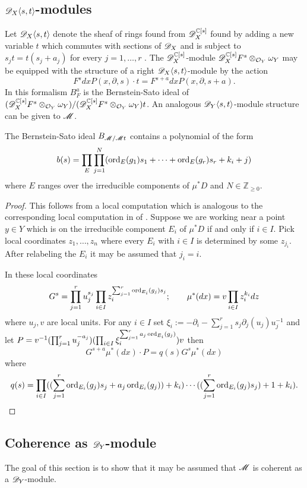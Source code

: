  \subsection{$\mathscr{D}_X\langle s, t\rangle$-modules}
 Let $\mathscr{D}_X\langle s,t \rangle$ denote the sheaf of rings found from $\mathscr{D}_X^{\mathbb{C}[s]}$ found by adding a new variable $t$ which commutes with sections of $\mathscr{D}_X$ and is subject to $s_j t = t(s_j +a_j)$ for every $j=1,\ldots, r$ .
 The $\mathscr{D}_X^{\mathbb{C}[s]}$-module $\mathscr{D}_X^{\mathbb{C}[s]} F^s\otimes_{\mathcal{O}_Y}\omega_Y$ may be equipped with the structure of a right $\mathscr{D}_X\langle s, t\rangle$-module by the action
 $$F^sdx P(x,\partial,s) \cdot t  =F^{s + a}dx P(x,\partial, s + a).$$
 In this formalism $B_F^a$ is the Bernstein-Sato ideal of $(\mathscr{D}_X^{\mathbb{C}[s]} F^s\otimes_{\mathcal{O}_Y}\omega_Y) / (\mathscr{D}_X^{\mathbb{C}[s]} F^s\otimes_{\mathcal{O}_Y}\omega_Y) t$.
 An analogous $\mathscr{D}_Y\langle s,t\rangle$-module structure can be given to $\mathscr{M}$.
 \begin{lemma}\label{lem: BernsteinSatoPolynomialUpstairs}
  The Bernstein-Sato ideal $B_{\mathscr{M}/\mathscr{M} t}$ contains a polynomial of the form
  $$b(s)=\prod_E \prod_{j=1}^N(\operatorname{ord}_{E}(g_1) s_1 + \cdots + \operatorname{ord}_{E}(g_r) s_r + k_i + j)$$
  where $E$ ranges over the irreducible components of $\mu^*D$ and $N\in \mathbb{Z}_{\geq 0}$.
 \end{lemma}
 \begin{proof}
  This follows from a local computation which is analogous to the corresponding local computation in  of \cite[Section 4]{lichtin1989poles}.
 Suppose we are working near a point $y\in Y$ which is on the irreducible component $E_i$ of $\mu^*D$ if and only if $i\in I$.
 Pick local coordinates $z_1,\ldots,z_n$ where every $E_i$ with $i\in I$ is determined by some $z_{j_i}$.
 After relabeling the $E_i$ it may be assumed that $j_i = i$.

 In these local coordinates
 $$G^s = \prod_{j=1}^r u_j^{s_j} \prod_{i\in I} z_i^{\sum_{j=1}^r   \operatorname{ord}_{E_i}(g_j)s_j};\qquad \mu^*(dx) = v \prod_{i\in I} z_i^{k_i} dz$$
 where $u_j, v$ are local units.
 For any $i\in I$ set $\xi_i := -\partial_i - \sum_{j=1}^{r}s_j\partial_j(u_j)u_j^{-1}$ and let $P = v^{-1}(\prod_{j=1}^r u_j^{-a_j}) (\prod_{i\in I}\xi_i^{\sum_{j=1}^r a_j\operatorname{ord}_{E_i}(g_j)}) v$ then
 $$G^{s+a}\mu^*(dx) \cdot P =  q(s) G^s \mu^*(dx) $$
 where
 $$q(s) = \prod_{i\in I}((\sum_{j=1}^r \operatorname{ord}_{E_i}(g_j)s_j + a_j\operatorname{ord}_{E_i}(g_j)) + k_i)\cdots((\sum_{j=1}^r \operatorname{ord}_{E_i}(g_j)s_j) + 1 + k_i ).$$
 \end{proof}
 \subsection{Coherence as $\mathscr{D}_Y$-module}
  The goal of this section is to show that it may be assumed that $\mathscr{M}$ is coherent as a $\mathscr{D}_Y$-module.

